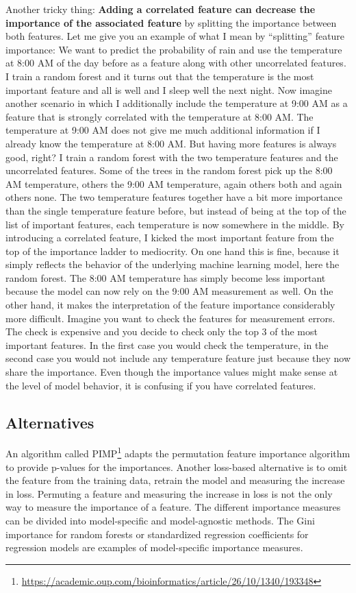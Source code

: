 \documentclass[
  10pt,
]{scrbook}
\renewcommand{\href}[2]{#2\footnote{\url{#1}}}
\begin{document}
Another tricky thing:
\textbf{Adding a correlated feature can decrease the importance of the associated feature} by splitting the importance between both features.
Let me give you an example of what I mean by ``splitting'' feature importance:
We want to predict the probability of rain and use the temperature at 8:00 AM of the day before as a feature along with other uncorrelated features.
I train a random forest and it turns out that the temperature is the most important feature and all is well and I sleep well the next night.
Now imagine another scenario in which I additionally include the temperature at 9:00 AM as a feature that is strongly correlated with the temperature at 8:00 AM.
The temperature at 9:00 AM does not give me much additional information if I already know the temperature at 8:00 AM.
But having more features is always good, right?
I train a random forest with the two temperature features and the uncorrelated features.
Some of the trees in the random forest pick up the 8:00 AM temperature, others the 9:00 AM temperature, again others both and again others none.
The two temperature features together have a bit more importance than the single temperature feature before, but instead of being at the top of the list of important features, each temperature is now somewhere in the middle.
By introducing a correlated feature, I kicked the most important feature from the top of the importance ladder to mediocrity.
On one hand this is fine, because it simply reflects the behavior of the underlying machine learning model, here the random forest.
The 8:00 AM temperature has simply become less important because the model can now rely on the 9:00 AM measurement as well.
On the other hand, it makes the interpretation of the feature importance considerably more difficult.
Imagine you want to check the features for measurement errors.
The check is expensive and you decide to check only the top 3 of the most important features.
In the first case you would check the temperature, in the second case you would not include any temperature feature just because they now share the importance.
Even though the importance values might make sense at the level of model behavior, it is confusing if you have correlated features.

\hypertarget{alternatives-1}{%
\subsection{Alternatives}\label{alternatives-1}}

An algorithm called \href{https://academic.oup.com/bioinformatics/article/26/10/1340/193348}{PIMP} adapts the permutation feature importance algorithm to provide p-values for the importances.
Another loss-based alternative is to omit the feature from the training data, retrain the model and measuring the increase in loss.
Permuting a feature and measuring the increase in loss is not the only way to measure the importance of a feature.
The different importance measures can be divided into model-specific and model-agnostic methods.
The Gini importance for random forests or standardized regression coefficients for regression models are examples of model-specific importance measures.
\end{document}
